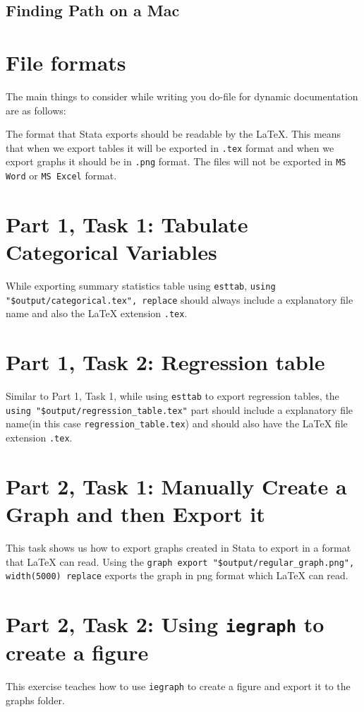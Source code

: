 \documentclass[]{article}
\begin{document}
\subsection*{Finding Path on a Mac}


\section*{File formats}
The main things to consider while writing you do-file for dynamic documentation are as follows: 

The format that Stata exports should be readable by the {\LaTeX}. This means that when we export tables it will be exported in \texttt{.tex} format and when we export graphs it should be in \texttt{.png} format. 
The files will not be exported in \texttt{MS Word} or \texttt{MS Excel} format.

\section*{Part 1, Task 1: Tabulate Categorical Variables}

While exporting summary statistics table using \texttt{esttab}, \verb|using 	"$output/categorical.tex", replace| should always include a explanatory file name and also the {\LaTeX} extension \texttt{.tex}.

\section*{Part 1, Task 2: Regression table}

Similar to Part 1, Task 1, while using \texttt{esttab} to export regression tables, the \verb|using "$output/regression_table.tex"| part should include a explanatory file name(in this case \texttt{regression\_table.tex}) and should also have the {\LaTeX} file extension \texttt{.tex}.

\section*{Part 2, Task 1: Manually Create a Graph and then Export it}

This task shows us how to export graphs created in Stata to export in a format that {\LaTeX} can read. Using the \verb|graph export "$output/regular_graph.png", width(5000) replace| 
exports the graph in png format which {\LaTeX} can read. 
\section*{Part 2, Task 2: Using \texttt{iegraph} to create a figure}
This exercise teaches how to use \texttt{iegraph} to create a figure and export it to the graphs folder. \\
\end{document}
